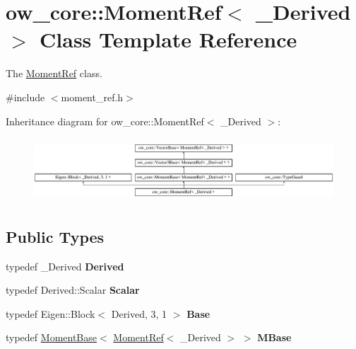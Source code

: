\hypertarget{classow__core_1_1MomentRef}{}\section{ow\+\_\+core\+:\+:Moment\+Ref$<$ \+\_\+\+Derived $>$ Class Template Reference}
\label{classow__core_1_1MomentRef}


The \hyperlink{classow__core_1_1MomentRef}{Moment\+Ref} class.  




{\ttfamily \#include $<$moment\+\_\+ref.\+h$>$}

Inheritance diagram for ow\+\_\+core\+:\+:Moment\+Ref$<$ \+\_\+\+Derived $>$\+:\begin{figure}[H]
\begin{center}
\leavevmode
\includegraphics[height=2.400857cm]{de/d46/classow__core_1_1MomentRef}
\end{center}
\end{figure}
\subsection*{Public Types}
\begin{DoxyCompactItemize}
\item 
typedef \+\_\+\+Derived {\bfseries Derived}\hypertarget{classow__core_1_1MomentRef_a8381c7f3d2123c9d388b41dfa746f77d}{}\label{classow__core_1_1MomentRef_a8381c7f3d2123c9d388b41dfa746f77d}

\item 
typedef Derived\+::\+Scalar {\bfseries Scalar}\hypertarget{classow__core_1_1MomentRef_a5c0175068a276dde3d7b0c2134054734}{}\label{classow__core_1_1MomentRef_a5c0175068a276dde3d7b0c2134054734}

\item 
typedef Eigen\+::\+Block$<$ Derived, 3, 1 $>$ {\bfseries Base}\hypertarget{classow__core_1_1MomentRef_a353477d55d98e50303c0728a1104b9c2}{}\label{classow__core_1_1MomentRef_a353477d55d98e50303c0728a1104b9c2}

\item 
typedef \hyperlink{classow__core_1_1MomentBase}{Moment\+Base}$<$ \hyperlink{classow__core_1_1MomentRef}{Moment\+Ref}$<$ \+\_\+\+Derived $>$ $>$ {\bfseries M\+Base}\hypertarget{classow__core_1_1MomentRef_ae11106024758a017e4c0f10f969fd940}{}\label{classow__core_1_1MomentRef_ae11106024758a017e4c0f10f969fd940}

\end{DoxyCompactItemize}
